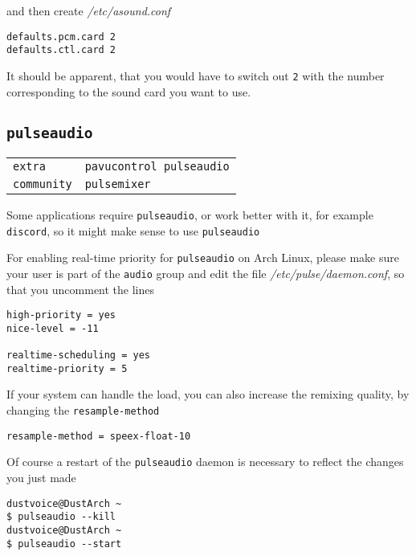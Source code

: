 \documentclass[9pt]{report}
\newenvironment{NOTE}
{\begin{tcolorbox}[colback=admonitionBG,coltitle=draculaFG,colframe=draculaBlue,colbacktitle=draculaBlue,title=NOTE]}
{\end{tcolorbox}}
\newenvironment{packagetable}
{\begin{longtabu}to \textwidth [b]{X[1,r]|X[1,l]}}
{\end{longtabu}}
\begin{document}
and then create \textit{/etc/asound.conf}


\begin{verbatim}
defaults.pcm.card 2
defaults.ctl.card 2
\end{verbatim}

\begin{NOTE}
    It should be apparent, that you would have to switch out \texttt{2} with the number corresponding to the sound card you want to use.

\end{NOTE}

\newpage

\hypertarget{x-pulseaudio}{\subsection{\texttt{pulseaudio}}}
\begin{packagetable}
    \texttt{extra} & \texttt{pavucontrol pulseaudio} \\ 
    \texttt{community} & \texttt{pulsemixer} \\ 
\end{packagetable}

Some applications require \texttt{pulseaudio}, or work better with it, for example \texttt{discord}, so it might make sense to use \texttt{pulseaudio}


For enabling real-time priority for \texttt{pulseaudio} on Arch Linux, please make sure your user is part of the \texttt{audio} group and edit the file \textit{/etc/pulse/daemon.conf}, so that you uncomment the lines


\begin{verbatim}
high-priority = yes
nice-level = -11

realtime-scheduling = yes
realtime-priority = 5
\end{verbatim}

If your system can handle the load, you can also increase the remixing quality, by changing the \texttt{resample-method}


\begin{verbatim}
resample-method = speex-float-10
\end{verbatim}

Of course a restart of the \texttt{pulseaudio} daemon is necessary to reflect the changes you just made


\begin{verbatim}
dustvoice@DustArch ~
$ pulseaudio --kill
dustvoice@DustArch ~
$ pulseaudio --start
\end{verbatim}
\end{document}
